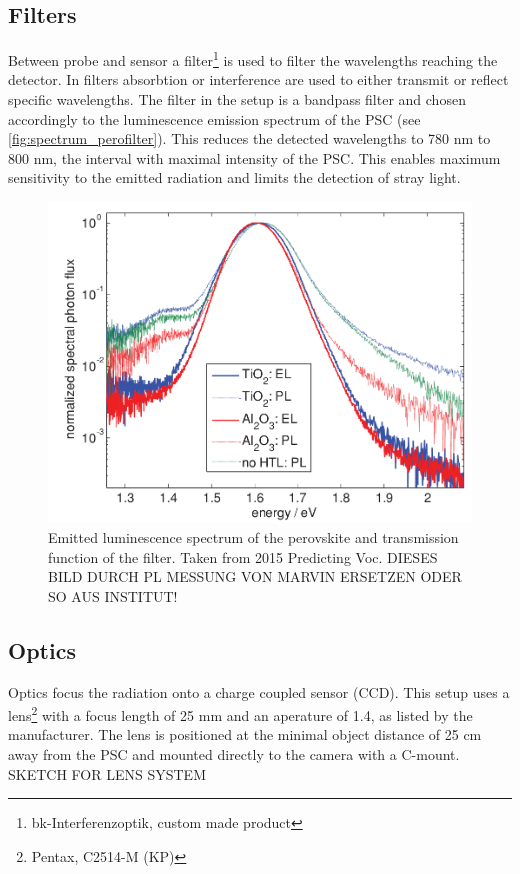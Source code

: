 \subsection{Filters}
Between probe and sensor a filter\footnote{bk-Interferenzoptik, custom made product} is used to filter the wavelengths reaching the detector. In filters absorbtion or interference are used to either transmit or reflect specific wavelengths. The filter in the setup is a bandpass filter and chosen accordingly to the luminescence emission spectrum of the PSC (see \autoref{fig:spectrum_perofilter}). This reduces the detected wavelengths to 780 nm to 800 nm, the interval with maximal intensity of the PSC. This enables maximum sensitivity to the emitted radiation and limits the detection of stray light. %

\begin{figure}
	\centering
	\includegraphics[width=0.7\linewidth]{Images/ExperimentalSetup/Perovskite_Spectrum}
	\caption{Emitted luminescence spectrum of the perovskite and transmission function of the filter. Taken from 2015 Predicting Voc. DIESES BILD DURCH PL MESSUNG VON MARVIN ERSETZEN ODER SO AUS INSTITUT!}
	\label{fig:spectrum_perofilter}
\end{figure}
\subsection{Optics}
Optics focus the radiation onto a charge coupled sensor (CCD). This setup uses a lens\footnote{Pentax, C2514-M (KP)} with a focus length of 25 mm and an aperature of 1.4, as listed by the manufacturer. The lens is positioned at the minimal object distance of  25 cm away from the PSC and mounted directly to the camera with a C-mount.
\\
SKETCH FOR LENS SYSTEM
\\


